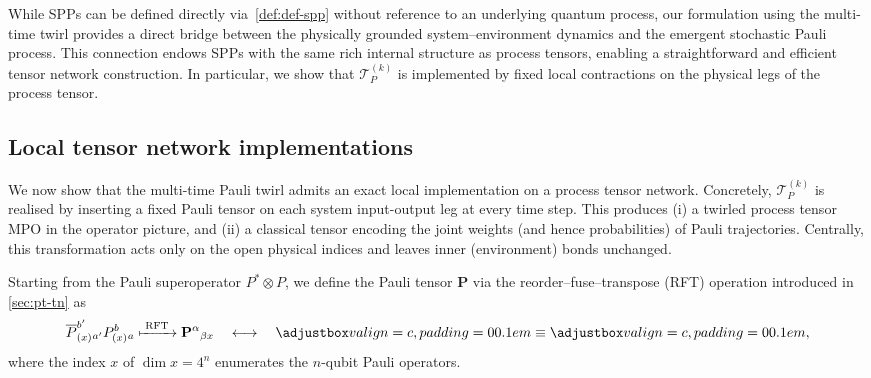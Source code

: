 While SPPs can be defined directly via~\cref{def:def-spp} without reference to an underlying quantum process, our formulation using the multi-time twirl provides a direct bridge between the physically grounded system--environment dynamics and the emergent stochastic Pauli process. This connection endows SPPs with the same rich internal structure as process tensors, enabling a straightforward and efficient tensor network construction. In particular, we show that \(\mathcal{T}_P^{(k)}\) is implemented by fixed local contractions on the physical legs of the process tensor.

\subsection{Local tensor network implementations}
We now show that the multi-time Pauli twirl admits an exact local implementation on a process tensor network. Concretely, \(\mathcal{T}_P^{(k)}\) is realised by inserting a fixed Pauli tensor on each system input-output leg at every time step. This produces (i) a twirled process tensor MPO in the operator picture, and (ii) a classical tensor encoding the joint weights (and hence probabilities) of Pauli trajectories. Centrally, this transformation acts only on the open physical indices and leaves inner (environment) bonds unchanged.

Starting from the Pauli superoperator \(P^* \otimes P\), we define the Pauli tensor \(\mathbf{P}\) via the reorder--fuse--transpose (RFT) operation introduced in \cref{sec:pt-tn} as
\begin{equation}
  \overline{P}_{(x)}^{b'}{}_{a'} P_{(x)}^b{}_a \xmapsto{\;\mathrm{RFT}\;}
  \mathbf{P}^\alpha{}_{\beta x}
  \quad\longleftrightarrow\quad
  \valignbox{}
  \equiv
  \valignbox{},
\end{equation}
where the index \(x\) of \(\dim{x} = 4^n\) enumerates the \(n\)-qubit Pauli operators.

